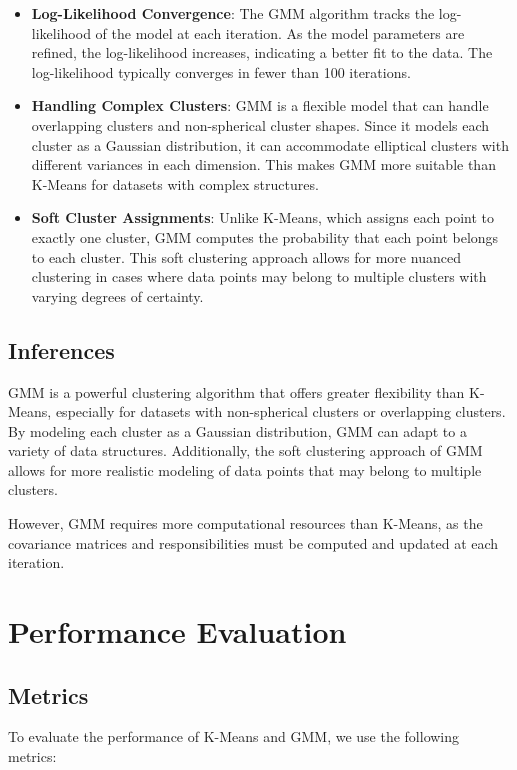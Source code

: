 \documentclass[conference]{IEEEtran}
\begin{document}
	\begin{itemize}
		\item \textbf{Log-Likelihood Convergence}: The GMM algorithm tracks the log-likelihood of the model at each iteration. As the model parameters are refined, the log-likelihood increases, indicating a better fit to the data. The log-likelihood typically converges in fewer than 100 iterations.
		\item \textbf{Handling Complex Clusters}: GMM is a flexible model that can handle overlapping clusters and non-spherical cluster shapes. Since it models each cluster as a Gaussian distribution, it can accommodate elliptical clusters with different variances in each dimension. This makes GMM more suitable than K-Means for datasets with complex structures.
		\item \textbf{Soft Cluster Assignments}: Unlike K-Means, which assigns each point to exactly one cluster, GMM computes the probability that each point belongs to each cluster. This soft clustering approach allows for more nuanced clustering in cases where data points may belong to multiple clusters with varying degrees of certainty.
	\end{itemize}
	
	\subsection{Inferences}
	
	GMM is a powerful clustering algorithm that offers greater flexibility than K-Means, especially for datasets with non-spherical clusters or overlapping clusters. By modeling each cluster as a Gaussian distribution, GMM can adapt to a variety of data structures. Additionally, the soft clustering approach of GMM allows for more realistic modeling of data points that may belong to multiple clusters.
	
	However, GMM requires more computational resources than K-Means, as the covariance matrices and responsibilities must be computed and updated at each iteration.
	
	\section{Performance Evaluation}
	\subsection{Metrics}
	
	To evaluate the performance of K-Means and GMM, we use the following metrics:
	
\end{document}
